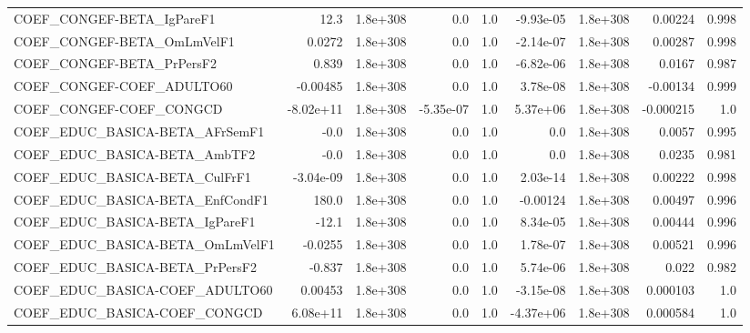 \begin{tabular}{lrrrrrrrr}
COEF\_CONGEF-BETA\_IgPareF1             &        12.3 &     1.8e+308 &        0.0 &      1.0 &  -9.93e-05 &    1.8e+308 &      0.00224 &         0.998 \\
COEF\_CONGEF-BETA\_OmLmVelF1            &      0.0272 &     1.8e+308 &        0.0 &      1.0 &  -2.14e-07 &    1.8e+308 &      0.00287 &         0.998 \\
COEF\_CONGEF-BETA\_PrPersF2             &       0.839 &     1.8e+308 &        0.0 &      1.0 &  -6.82e-06 &    1.8e+308 &       0.0167 &         0.987 \\
COEF\_CONGEF-COEF\_ADULTO60             &    -0.00485 &     1.8e+308 &        0.0 &      1.0 &   3.78e-08 &    1.8e+308 &     -0.00134 &         0.999 \\
COEF\_CONGEF-COEF\_CONGCD               &   -8.02e+11 &     1.8e+308 &  -5.35e-07 &      1.0 &   5.37e+06 &    1.8e+308 &    -0.000215 &           1.0 \\
COEF\_EDUC\_BASICA-BETA\_AFrSemF1        &        -0.0 &     1.8e+308 &        0.0 &      1.0 &        0.0 &    1.8e+308 &       0.0057 &         0.995 \\
COEF\_EDUC\_BASICA-BETA\_AmbTF2          &        -0.0 &     1.8e+308 &        0.0 &      1.0 &        0.0 &    1.8e+308 &       0.0235 &         0.981 \\
COEF\_EDUC\_BASICA-BETA\_CulFrF1         &   -3.04e-09 &     1.8e+308 &        0.0 &      1.0 &   2.03e-14 &    1.8e+308 &      0.00222 &         0.998 \\
COEF\_EDUC\_BASICA-BETA\_EnfCondF1       &       180.0 &     1.8e+308 &        0.0 &      1.0 &   -0.00124 &    1.8e+308 &      0.00497 &         0.996 \\
COEF\_EDUC\_BASICA-BETA\_IgPareF1        &       -12.1 &     1.8e+308 &        0.0 &      1.0 &   8.34e-05 &    1.8e+308 &      0.00444 &         0.996 \\
COEF\_EDUC\_BASICA-BETA\_OmLmVelF1       &     -0.0255 &     1.8e+308 &        0.0 &      1.0 &   1.78e-07 &    1.8e+308 &      0.00521 &         0.996 \\
COEF\_EDUC\_BASICA-BETA\_PrPersF2        &      -0.837 &     1.8e+308 &        0.0 &      1.0 &   5.74e-06 &    1.8e+308 &        0.022 &         0.982 \\
COEF\_EDUC\_BASICA-COEF\_ADULTO60        &     0.00453 &     1.8e+308 &        0.0 &      1.0 &  -3.15e-08 &    1.8e+308 &     0.000103 &           1.0 \\
COEF\_EDUC\_BASICA-COEF\_CONGCD          &    6.08e+11 &     1.8e+308 &        0.0 &      1.0 &  -4.37e+06 &    1.8e+308 &     0.000584 &           1.0 \\

\end{tabular}
